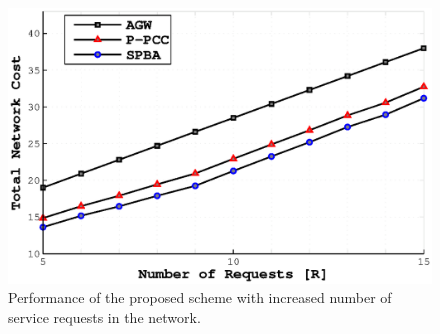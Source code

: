 \documentclass[journal]{IEEEtran}
\begin{document}
  \begin{figure}
    \includegraphics[width=1.1\columnwidth,trim=1.1cm 0.5cm 0cm 0.8cm]{mc_ppcc_naive_R_520_final.eps}
    \caption{Performance of the proposed scheme with increased number of service requests in the network.}
    \label{fig:cost_no_requests}
  \end{figure}
\end{document}
